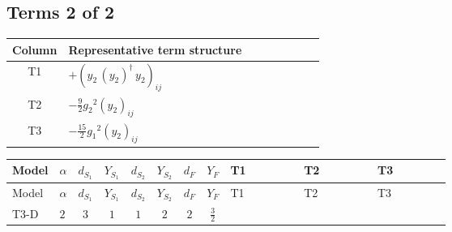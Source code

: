 \documentclass[8pt]{article}
\begin{document}
\begin{landscape}
\subsection*{Terms 2 of 2}
\begin{center}
\begin{tabular}{@{}c >{\raggedright\arraybackslash}p{0.82\linewidth}@{}}
\toprule
Column & Representative term structure \\
\midrule
T1 & \(\displaystyle +\left({y_2}\,\left({y_2}\right)^{\dagger}\,{y_2}\right)_{ij}\) \\
\midrule
T2 & \(\displaystyle -\frac{9}{2} {g_2}^2 \left({y_2}\right)_{ij}\) \\
\midrule
T3 & \(\displaystyle -\frac{15}{2} {g_1}^2 \left({y_2}\right)_{ij}\) \\
\midrule
\bottomrule
\end{tabular}
\end{center}
\smallskip
\tiny
\begin{longtable}{@{}llcccccc >{\raggedright\arraybackslash}p{0.21\linewidth} >{\raggedright\arraybackslash}p{0.21\linewidth} >{\raggedright\arraybackslash}p{0.21\linewidth}@{}}
\toprule
Model & $\alpha$ & $d_{S_1}$ & $Y_{S_1}$ & $d_{S_2}$ & $Y_{S_2}$ & $d_F$ & $Y_F$ & T1 & T2 & T3 \\
\midrule
\endfirsthead
\toprule
Model & $\alpha$ & $d_{S_1}$ & $Y_{S_1}$ & $d_{S_2}$ & $Y_{S_2}$ & $d_F$ & $Y_F$ & T1 & T2 & T3 \\
\midrule
\endhead
T3-D & $2$ & $3$ & $1$ & $1$ & $2$ & $2$ & $\frac{3}{2}$ & \scriptsize\adjustbox{max width=\linewidth}{$\begin{gathered} +\left({y_2}\,\left({y_2}\right)^{\dagger}\,{y_2}\right)_{ij}\end{gathered}$} & \scriptsize\adjustbox{max width=\linewidth}{$\begin{gathered} -\frac{9}{2} {g_2}^2 \left({y_2}\right)_{ij}\end{gathered}$} & \scriptsize\adjustbox{max width=\linewidth}{$\begin{gathered} -\frac{15}{2} {g_1}^2 \left({y_2}\right)_{ij}\end{gathered}$} \\
\midrule
\bottomrule
\end{longtable}
\clearpage

\end{landscape}
\end{document}
